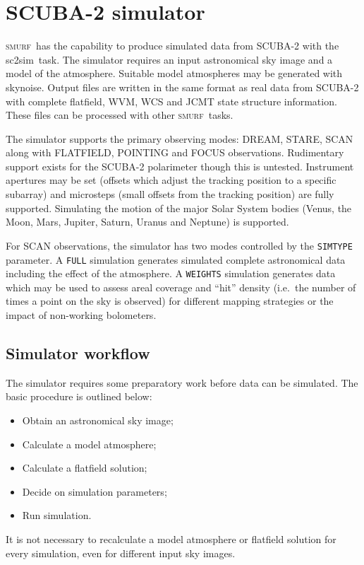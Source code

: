 \documentclass[twoside,11pt]{article}
\newcommand{\xref}[3]{#1}
\newcommand{\xlabel}[1]{}
\renewcommand{\_}{\texttt{\symbol{95}}}
\newcommand{\SMURF}{\textsc{smurf}}
\newcommand{\task}[1]{\textsf{#1}}
\newcommand{\sctwosim}{\xref{\task{sc2sim}}{sun258}{SC2SIM}}
\newcommand{\skynoise}{\xref{\task{skynoise}}{sun258}{SKYNOISE}}
\begin{document}
\section{\xlabel{simulator}SCUBA-2 simulator\label{se:sc2sim}}

\SMURF\ has the capability to produce simulated data from SCUBA-2 with
the \sctwosim\ task. The simulator requires an input astronomical sky
image and a model of the atmosphere. Suitable model atmospheres may be
generated with \skynoise. Output files are written in the same format
as real data from SCUBA-2 with complete flatfield, WVM, WCS and JCMT
state structure information. These files can be processed with other
\SMURF\ tasks.

The simulator supports the primary observing modes: DREAM, STARE, SCAN
along with FLATFIELD, POINTING and FOCUS observations. Rudimentary
support exists for the SCUBA-2 polarimeter though this is
untested. Instrument apertures may be set (offsets which adjust the
tracking position to a specific subarray) and microsteps (small
offsets from the tracking position) are fully supported. Simulating
the motion of the major Solar System bodies (Venus, the Moon, Mars,
Jupiter, Saturn, Uranus and Neptune) is supported.

For SCAN observations, the simulator has two modes controlled by the
\texttt{SIMTYPE} parameter. A \texttt{FULL} simulation generates
simulated complete astronomical data including the effect of the
atmosphere. A \texttt{WEIGHTS} simulation generates data which may be
used to assess areal coverage and ``hit'' density (i.e.\ the number of
times a point on the sky is observed) for different mapping strategies
or the impact of non-working bolometers.

\subsection{\xlabel{simuse}Simulator workflow\label{se:simuse}}

The simulator requires some preparatory work before data can be
simulated. The basic procedure is outlined below:
\begin{itemize}
\item Obtain an astronomical sky image;
\item Calculate a model atmosphere;
\item Calculate a flatfield solution;
\item Decide on simulation parameters;
\item Run simulation.
\end{itemize}
It is not necessary to recalculate a model atmosphere or flatfield
solution for every simulation, even for different input sky images. 
\end{document}
